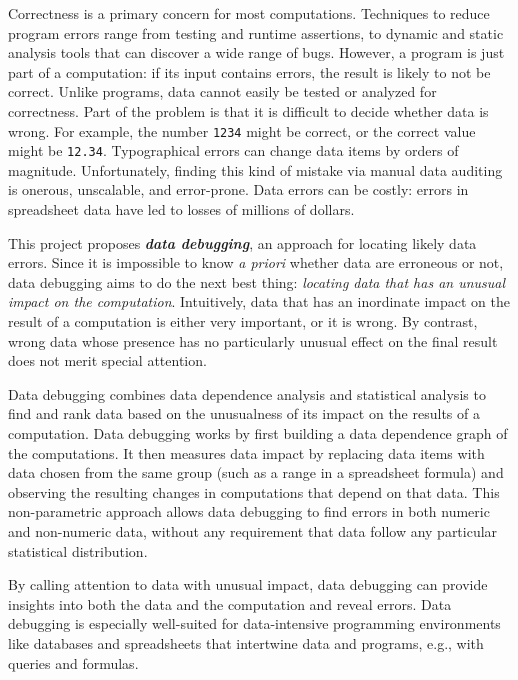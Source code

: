 \projectname{}

Correctness is a primary
concern for most computations. Techniques to reduce program errors range from testing and
runtime assertions, to dynamic and static analysis tools that can
discover a wide range of bugs. However, a program is just part of
a computation: if its input contains errors, the result
is likely to not be correct. Unlike programs, data
cannot easily be tested or analyzed for correctness.  Part of the
problem is that it is difficult to decide whether data
is wrong. For example, the number \texttt{1234}
might be correct, or the correct value might
be \texttt{12.34}. Typographical errors can change data items by
orders of magnitude. Unfortunately, finding this kind of mistake via
manual data auditing is onerous, unscalable, and error-prone. Data
errors can be costly: errors in spreadsheet data have led to losses of
millions of dollars.

This project proposes \emph{\bf data debugging}, an approach for
locating likely data errors. Since it is impossible to know \emph{a
priori} whether data are erroneous or not, data debugging aims to do
the next best thing: \emph{locating data that has an unusual impact on
the computation}. Intuitively, data that has an inordinate impact on
the result of a computation is either very important, or it is wrong. By
contrast, wrong data whose presence has no particularly unusual effect
on the final result does not merit special attention.

Data debugging combines data dependence analysis and statistical
analysis to find and rank data based on the unusualness of its impact
on the results of a computation. Data debugging works by first
building a data dependence graph of the computations. It then measures
data impact by replacing data items with data chosen from the same
group (such as a range in a spreadsheet formula) and observing the
resulting changes in computations that depend on that data. This
non-parametric approach allows data debugging to find errors in both
numeric and non-numeric data, without any requirement that data follow
any particular statistical distribution.

By calling attention to data with unusual impact, data debugging can
provide insights into both the data and the computation and reveal
errors. Data debugging is especially well-suited for data-intensive
programming environments like databases and spreadsheets that
intertwine data and programs, e.g., with queries and formulas.

